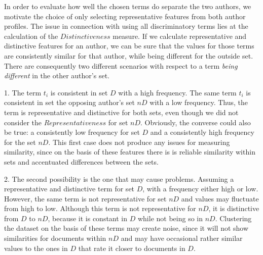 \documentclass[a4paper,10pt,twoside,fleqn]{article}
\begin{document}
In order to evaluate how well the chosen terms do separate the two authors, we motivate the choice of only selecting representative features from both author profiles. 
The issue in connection with using all discriminatory terms lies at the calculation of the $Distinctiveness$ measure. 
If we calculate representative and distinctive features for an author, we can be sure that the values for those 
terms are consistently similar for that author, while being different for the outside set. 
There are consequently two different scenarios with respect to a term \emph{being different} in the other author's set. 

1. The term $t_i$ is consistent in set $D$ with a high frequency. The same term $t_i$ is consistent in set the opposing author's set $nD$ with a low frequency. 
Thus, the term is representative and distinctive for both sets, even though we did not consider the $Representativeness$ for set $nD$. 
Obviously, the converse could also be true: a consistently low frequency for set $D$ and a consistently high frequency for the set $nD$.
This first case does not produce any issues for measuring similarity, since on the basis of these features there is is reliable similarity within sets and
accentuated differences between the sets. 

2. The second possibility is the one that may cause problems. Assuming a representative and distinctive term for set $D$, with a frequency either high or low. 
However, the same term is not representative for set $nD$ and values may fluctuate from high to low. Although this term is not representative for $nD$, it
is distinctive from $D$ to $nD$, because it is constant in $D$ while not being so in $nD$. 
Clustering the dataset on the basis of these terms may create noise, since it will not show similarities for documents within $nD$ and 
may have occasional rather similar values to the ones in $D$ that rate it closer to documents in $D$.
\end{document}
